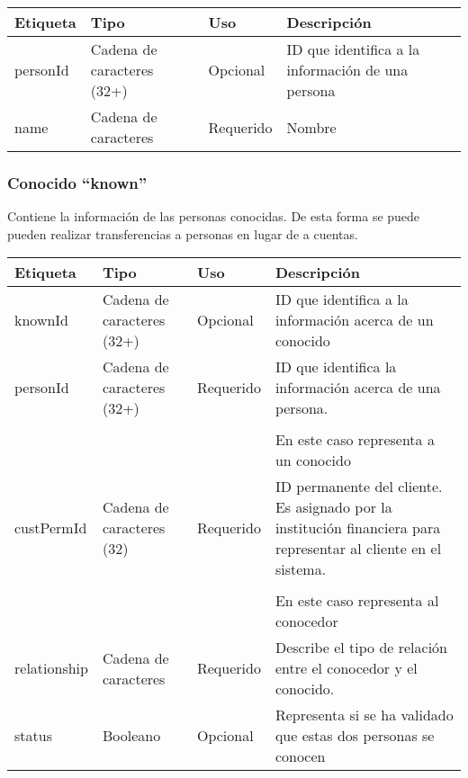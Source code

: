 \begin{center}
\begin{longtable}{|>{\centering\arraybackslash}p{}|>{\centering\arraybackslash}p{}|>{\centering\arraybackslash}p{}|>{\centering\arraybackslash}p{}|}
\hline 
\bfseries {Etiqueta} & \bfseries {Tipo} & \bfseries {Uso} & \bfseries {Descripción} \\ 
\hline 
personId & Cadena de caracteres (32+) & Opcional & ID que identifica a la información de una persona \\ 
\hline 
name & Cadena de caracteres & Requerido & Nombre \\
\hline 
\end{longtable}
\end{center}

\subsubsection{Conocido ``known''}
Contiene la información de las personas conocidas. De esta forma se puede pueden
realizar transferencias a personas en lugar de a cuentas.

\begin{center}
\begin{longtable}{|>{\centering\arraybackslash}p{}|>{\centering\arraybackslash}p{}|>{\centering\arraybackslash}p{}|>{\centering\arraybackslash}p{}|}
\hline 
\bfseries {Etiqueta} & \bfseries {Tipo} & \bfseries {Uso} & \bfseries {Descripción} \\ 
\hline 
knownId & Cadena de caracteres (32+) & Opcional & ID que identifica a la información acerca de un conocido	 \\ 
\hline 
personId & Cadena de caracteres (32+) & Requerido & ID que identifica la información acerca de una persona.
\\ & & & \\
& & & En este caso representa a un conocido \\
\hline 
custPermId & Cadena de caracteres (32) & Requerido & ID permanente del cliente. Es asignado por la institución financiera para representar al cliente en el sistema.
\\ & & & \\
& & & En este caso representa al conocedor \\
\hline 
relationship & Cadena de caracteres & Requerido & Describe el tipo de relación entre el conocedor y el conocido. \\ 
\hline 
status & Booleano & Opcional & Representa si se ha validado que estas dos personas se conocen \\ 
\hline 
\end{longtable}
\end{center}

